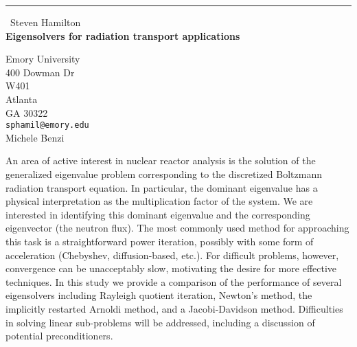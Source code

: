 \documentclass{report}
\begin{document}
\begin{center}
\rule{6in}{1pt} \
{\large Steven Hamilton \\
{\bf Eigensolvers for radiation transport applications}}

Emory University \\ 400 Dowman Dr  \\ W401 \\ Atlanta \\ GA 30322
\\
{\tt sphamil@emory.edu}\\
Michele Benzi\end{center}

An area of active interest in nuclear reactor analysis is the solution of
the generalized eigenvalue problem corresponding to the discretized
Boltzmann radiation transport equation. In particular, the dominant
eigenvalue has a physical interpretation as the multiplication factor of
the system. We are interested in identifying this dominant eigenvalue and
the corresponding eigenvector (the neutron flux). The most commonly used
method for approaching this task is a straightforward power iteration,
possibly with some form of acceleration (Chebyshev, diffusion-based,
etc.). For difficult problems, however, convergence can be unacceptably
slow, motivating the desire for more effective techniques. In this study
we provide a comparison of the performance of several eigensolvers
including Rayleigh quotient iteration, Newton's method, the implicitly
restarted Arnoldi method, and a Jacobi-Davidson method. Difficulties in
solving linear sub-problems will be addressed, including a discussion of
potential preconditioners.
\end{document}
